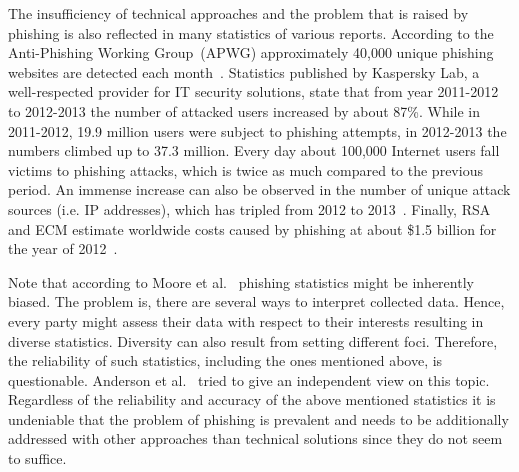 The insufficiency of technical approaches and the problem that is raised by phishing is also reflected in many statistics of various reports. 
 According to the Anti-Phishing Working Group~(APWG) approximately 40,000 unique phishing websites are detected each month~\cite{antiphishingtrendreport2013}. Statistics published by Kaspersky Lab, a well-respected provider for IT security solutions, state that from year 2011-2012 to 2012-2013 the number of attacked users increased by about 87\%. 
While in 2011-2012, 19.9 million users were subject to phishing attempts, in 2012-2013 the numbers climbed up to 37.3 million. 
 Every day about 100,000 Internet users fall victims to phishing attacks, which is twice as much compared to the previous period. An immense increase can also be observed in the number of unique attack sources (i.e. IP addresses), which has tripled from 2012 to 2013~\cite{kasperskyreport2013}. 
Finally, RSA and ECM estimate worldwide costs caused by phishing at about \$1.5 billion for the year of 2012~\cite{rsa2013}. 

Note that according to Moore et al.~\cite{moore2010hard} phishing statistics might be inherently biased. 
The problem is, there are several ways to interpret collected data. 
Hence, every party might assess their data with respect to their interests resulting in diverse statistics. 
Diversity can also result from setting different foci.
Therefore, the reliability of such statistics, including the ones mentioned above, is questionable. 
Anderson et al.~\cite{anderson2012measuring} tried to give an independent view on this topic.
Regardless of the reliability and accuracy of the above mentioned statistics it is undeniable that the problem of phishing is prevalent and needs to be additionally addressed with other approaches than technical solutions since they do not seem to suffice.

